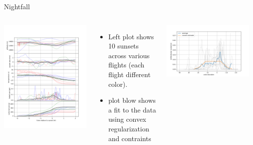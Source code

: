 \documentclass[10pt,mathserif]{beamer}
\begin{document}
\begin{frame}{Nightfall}
\begin{columns}
\includegraphics[width=\linewidth,trim={.7cm 0 1cm 3cm},clip]{nightfall_plts.png}
\begin{itemize}
\item Left plot shows 10 sunsets across various flights (each flight different color).
\item plot blow shows a fit to the data using convex regularization and contraints
\end{itemize}
\includegraphics[width=\linewidth,trim={.7cm 0 1cm 1cm},clip]{bal_avg.png}
\end{columns}
\end{frame}
\end{document}

